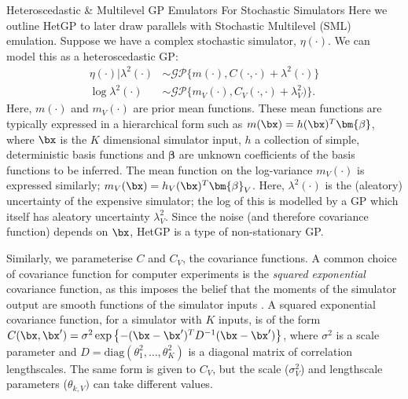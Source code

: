 \begin{chapter}{Heteroscedastic \& Multilevel GP Emulators For Stochastic Simulators\label{Ch:Hetsml}}
Here we outline HetGP \citep{Binois2018} to later draw parallels with Stochastic Multilevel (SML) emulation. Suppose we have a complex stochastic simulator, $\eta(\cdot)$. We can model this as a heteroscedastic GP:
\begin{align*}
\eta(\cdot) | \lambda^2(\cdot) &\sim  \mathcal{GP} \{ m(\cdot), C(\cdot, \cdot) + \lambda^2(\cdot) \}\nonumber \\
\log \lambda^2 (\cdot) &\sim  \mathcal{GP} \{ m_V (\cdot), C_V (\cdot, \cdot) + \lambda_{V}^2 ) \}.\nonumber
\end{align*}
\noindent Here, $m(\cdot)$ and $m_V(\cdot)$ are prior mean functions. These mean functions are typically expressed in a hierarchical form such as $m(\bx) = h(\bx)^T \bm{\beta}$, where $\bx$ is the $K$ dimensional simulator input, $h$ a collection of simple, deterministic basis functions and $\bm{\beta}$ are unknown coefficients of the basis functions to be inferred. The mean function on the log-variance $m_V(\cdot)$ is expressed similarly; $m_V(\bx) = h_V(\bx)^T \bm{\beta}_V$. Here, $\lambda^2(\cdot)$ is the (aleatory) uncertainty of the expensive simulator; the log of this is modelled by a GP which itself has aleatory uncertainty $\lambda^2_V$. Since the noise (and therefore covariance function) depends on $\bx$, HetGP is a type of non-stationary GP.

 Similarly, we parameterise $C$ and $C_V$, the covariance functions. A common choice of covariance function for computer experiments is the \emph{squared exponential} covariance function, as this imposes the belief that the moments of the simulator output are smooth functions of the simulator inputs \citep{Santner2003}. A squared exponential covariance function, for a simulator with $K$ inputs, is of the form $C(\bx, \bx') = \sigma^2 \exp \left\{  -(\bx - \bx')^{T}D^{-1}(\bx - \bx') \right\}$, where $\sigma^2$ is a scale parameter and $D = \text{diag}(\theta_1 ^2, \ldots, \theta_K ^2)$ is a diagonal matrix of correlation lengthscales. The same form is given to $C_V$, but the scale ($\sigma_V^2$) and lengthscale parameters ($\theta_{k, V})$ can take different values.


\end{chapter}
